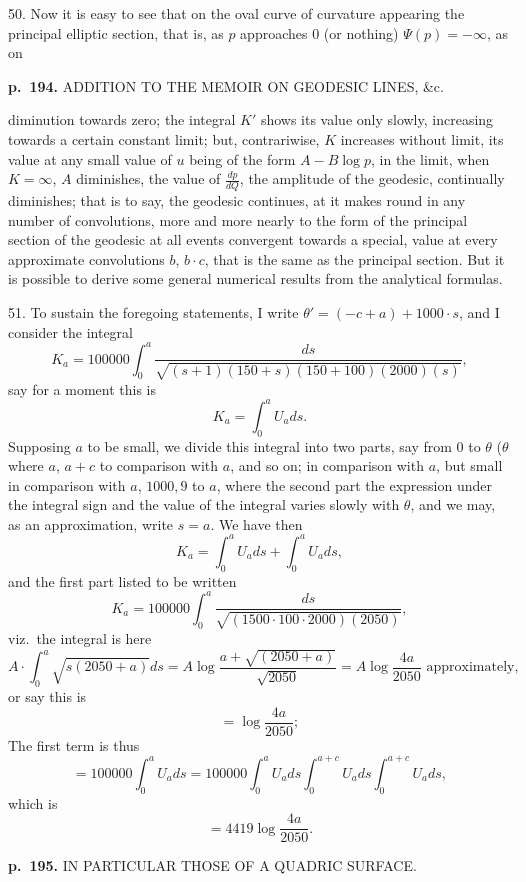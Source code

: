 \documentclass[11pt,a4paper]{article}
\begin{document}
50. Now it is easy to see that on the oval curve of curvature appearing the principal elliptic section, that is, as $p$ approaches $0$ (or nothing) $\Psi(p) = -\infty$, as on

\clearpage

\noindent
\textbf{p.~194.}  ADDITION TO THE MEMOIR ON GEODESIC LINES, \&c.

diminution towards zero; the integral $K'$ shows its value only slowly, increasing towards a certain constant limit; but, contrariwise, $K$ increases without limit, its value at any small value of $u$ being of the form $A - B \log p$, in the limit, when $K = \infty$, $A$ diminishes, the value of $\frac{dp}{dQ}$, the amplitude of the geodesic, continually diminishes; that is to say, the geodesic continues, at it makes round in any number of convolutions, more and more nearly to the form of the principal section of the geodesic at all events convergent towards a special, value at every approximate convolutions $b$, $b \cdot c$, that is the same as the principal section. But it is possible to derive some general numerical results from the analytical formulas.

51. To sustain the foregoing statements, I write $\theta' = (-c + a) + 1000 \cdot s$, and I consider the integral
\[
K_a = 100000 \int_0^a \frac{ds}{\sqrt{(s + 1)(150 + s)(150 + 100)(2000)(s)}},
\]
say for a moment this is
\[
K_a = \int_0^a U_a ds.
\]
Supposing $a$ to be small, we divide this integral into two parts, say from $0$ to $\theta$ ($\theta$ where $a$, $a + c$ to comparison with $a$, and so on; in comparison with $a$, but small in comparison with $a$, $1000, 9$ to $a$, where the second part the expression under the integral sign and the value of the integral varies slowly with $\theta$, and we may, as an approximation, write $s = a$. We have then
\[
K_a = \int_0^{a} U_a ds + \int_0^{a} U_a ds,
\]
and the first part listed to be written
\[
K_a = 100000 \int_0^{a} \frac{ds}{\sqrt{(1500 \cdot 100 \cdot 2000)(2050)}},
\]
viz.\ the integral is here
\[
A \cdot \int_0^a \sqrt{s(2050 + a)} ds = A \log \frac{a + \sqrt{(2050 + a)}}{\sqrt{2050}} = A \log \frac{4a}{2050} \text{ approximately},
\]
or say this is
\[
= \log \frac{4a}{2050};
\]
The first term is thus
\[
= 100000 \int_0^{a} U_a ds = 100000 \int_0^a U_a ds \int_0^{a + c} U_a ds \int_0^{a + c} U_a ds,
\]
which is
\[
= 4419 \log \frac{4a}{2050}.
\]

\clearpage

\noindent
\textbf{p.~195.}  IN PARTICULAR THOSE OF A QUADRIC SURFACE.
\end{document}
